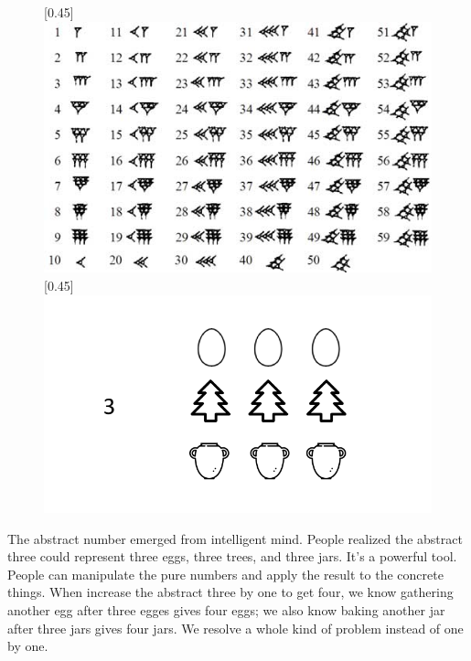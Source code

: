 \documentclass[UTF8]{article}
\begin{document}
\begin{figure}[htbp]
 \centering
 [0.45\linewidth]{
   \includegraphics[scale=0.42]{img/Babylonian_numerals.jpg}} \quad \quad
 [0.45\linewidth]{
   \includegraphics[scale=0.25]{img/abstract-num.png}}
 \captionsetup{labelformat=empty}
 \label{fig:babylonian-num}
 \label{fig:abstract-num}
\end{figure}

The abstract number emerged from intelligent mind. People realized the abstract three could represent three eggs, three trees, and three jars. It's a powerful tool. People can manipulate the pure numbers and apply the result to the concrete things. When increase the abstract three by one to get four, we know gathering another egg after three egges gives four eggs; we also know baking another jar after three jars gives four jars. We resolve a whole kind of problem instead of one by one.
\end{document}
